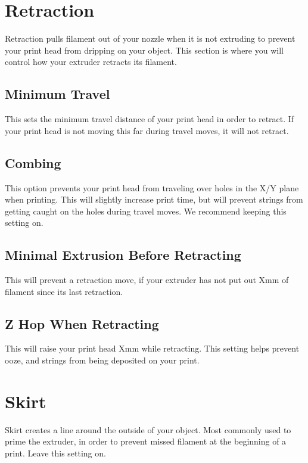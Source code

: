 \section{Retraction}
Retraction pulls filament out of your nozzle when it is not extruding to prevent your print head from dripping on your object. This section is where you will control how your extruder retracts its filament.

\subsection{Minimum Travel}
This sets the minimum travel distance of your print head in order to retract. If your print head is not moving this far during travel moves, it will not retract.

\subsection{Combing}
This option prevents your print head from traveling over holes in the X/Y plane when printing. This will slightly increase print time, but will prevent strings from getting caught on the holes during travel moves. We recommend keeping this setting on.

\subsection{Minimal Extrusion Before Retracting}
This will prevent a retraction move, if your extruder has not put out Xmm of filament since its last retraction.

\subsection{Z Hop When Retracting}
This will raise your print head Xmm while retracting. This setting helps prevent ooze, and strings from being deposited on your print. 

\section{Skirt}
Skirt creates a line around the outside of your object. Most commonly used to prime the extruder, in order to prevent missed filament at the beginning of a print. Leave this setting on.

